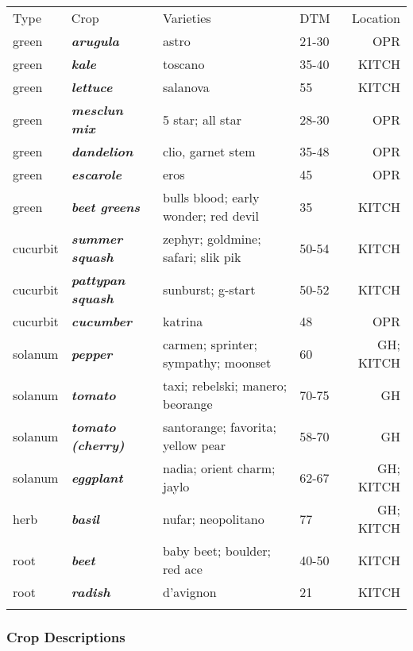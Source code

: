 \begin{longtable}[c]{@{}llllr@{}}
\toprule\addlinespace
Type & Crop & Varieties & DTM & Location
\\\addlinespace
\midrule\endhead
green & \textbf{\emph{arugula}} & astro & 21-30 & OPR
\\\addlinespace
green & \textbf{\emph{kale}} & toscano & 35-40 & KITCH
\\\addlinespace
green & \textbf{\emph{lettuce}} & salanova & 55 & KITCH
\\\addlinespace
green & \textbf{\emph{mesclun mix}} & 5 star; all star & 28-30 & OPR
\\\addlinespace
green & \textbf{\emph{dandelion}} & clio, garnet stem & 35-48 & OPR
\\\addlinespace
green & \textbf{\emph{escarole}} & eros & 45 & OPR
\\\addlinespace
green & \textbf{\emph{beet greens}} & bulls blood; early wonder; red
devil & 35 & KITCH
\\\addlinespace
cucurbit & \textbf{\emph{summer squash}} & zephyr; goldmine; safari;
slik pik & 50-54 & KITCH
\\\addlinespace
cucurbit & \textbf{\emph{pattypan squash}} & sunburst; g-start & 50-52 &
KITCH
\\\addlinespace
cucurbit & \textbf{\emph{cucumber}} & katrina & 48 & OPR
\\\addlinespace
solanum & \textbf{\emph{pepper}} & carmen; sprinter; sympathy; moonset &
60 & GH; KITCH
\\\addlinespace
solanum & \textbf{\emph{tomato}} & taxi; rebelski; manero; beorange &
70-75 & GH
\\\addlinespace
solanum & \textbf{\emph{tomato (cherry)}} & santorange; favorita; yellow
pear & 58-70 & GH
\\\addlinespace
solanum & \textbf{\emph{eggplant}} & nadia; orient charm; jaylo & 62-67
& GH; KITCH
\\\addlinespace
herb & \textbf{\emph{basil}} & nufar; neopolitano & 77 & GH; KITCH
\\\addlinespace
root & \textbf{\emph{beet}} & baby beet; boulder; red ace & 40-50 &
KITCH
\\\addlinespace
root & \textbf{\emph{radish}} & d'avignon & 21 & KITCH
\\\addlinespace
\bottomrule
\end{longtable}

\subsubsection{Crop Descriptions}\label{crop-descriptions}

